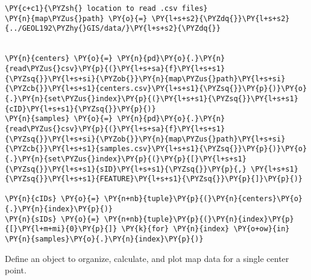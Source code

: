 \begin{tcolorbox}[breakable, size=fbox, boxrule=1pt, pad at break*=1mm,colback=cellbackground, colframe=cellborder]
\begin{Verbatim}[commandchars=\\\{\}]
\PY{c+c1}{\PYZsh{} location to read .csv files}
\PY{n}{map\PYZus{}path} \PY{o}{=} \PY{l+s+s2}{\PYZdq{}}\PY{l+s+s2}{../GEOL192\PYZhy{}GIS/data/}\PY{l+s+s2}{\PYZdq{}}


\PY{n}{centers} \PY{o}{=} \PY{n}{pd}\PY{o}{.}\PY{n}{read\PYZus{}csv}\PY{p}{(}\PY{l+s+sa}{f}\PY{l+s+s1}{\PYZsq{}}\PY{l+s+si}{\PYZob{}}\PY{n}{map\PYZus{}path}\PY{l+s+si}{\PYZcb{}}\PY{l+s+s1}{centers.csv}\PY{l+s+s1}{\PYZsq{}}\PY{p}{)}\PY{o}{.}\PY{n}{set\PYZus{}index}\PY{p}{(}\PY{l+s+s1}{\PYZsq{}}\PY{l+s+s1}{cID}\PY{l+s+s1}{\PYZsq{}}\PY{p}{)}
\PY{n}{samples} \PY{o}{=} \PY{n}{pd}\PY{o}{.}\PY{n}{read\PYZus{}csv}\PY{p}{(}\PY{l+s+sa}{f}\PY{l+s+s1}{\PYZsq{}}\PY{l+s+si}{\PYZob{}}\PY{n}{map\PYZus{}path}\PY{l+s+si}{\PYZcb{}}\PY{l+s+s1}{samples.csv}\PY{l+s+s1}{\PYZsq{}}\PY{p}{)}\PY{o}{.}\PY{n}{set\PYZus{}index}\PY{p}{(}\PY{p}{[}\PY{l+s+s1}{\PYZsq{}}\PY{l+s+s1}{sID}\PY{l+s+s1}{\PYZsq{}}\PY{p}{,} \PY{l+s+s1}{\PYZsq{}}\PY{l+s+s1}{FEATURE}\PY{l+s+s1}{\PYZsq{}}\PY{p}{]}\PY{p}{)}

\PY{n}{cIDs} \PY{o}{=} \PY{n+nb}{tuple}\PY{p}{(}\PY{n}{centers}\PY{o}{.}\PY{n}{index}\PY{p}{)}
\PY{n}{sIDs} \PY{o}{=} \PY{n+nb}{tuple}\PY{p}{(}\PY{n}{index}\PY{p}{[}\PY{l+m+mi}{0}\PY{p}{]} \PY{k}{for} \PY{n}{index} \PY{o+ow}{in} \PY{n}{samples}\PY{o}{.}\PY{n}{index}\PY{p}{)}
\end{Verbatim}
\end{tcolorbox}

Define an object to organize, calculate, and plot map data for a single
center point.

